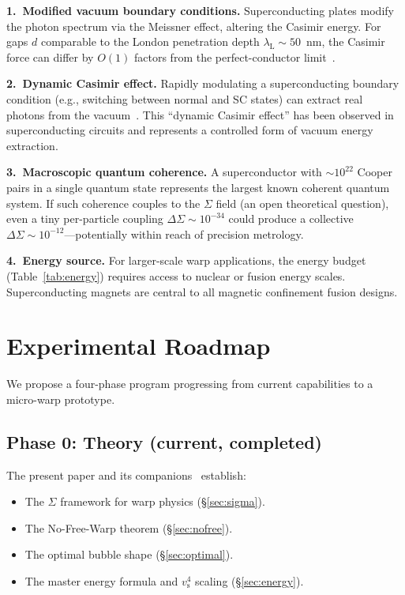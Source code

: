 \documentclass[prd,twocolumn,superscriptaddress,longbibliography]{revtex4-2}
\newcommand{\vs}{v_{\mathrm{s}}}
\begin{document}
\medskip
\noindent\textbf{1.\ Modified vacuum boundary conditions.}\;
Superconducting plates modify the photon spectrum via the Meissner
effect, altering the Casimir energy.  For gaps $d$ comparable to
the London penetration depth $\lambda_{\mathrm{L}} \sim 50$~nm,
the Casimir force can differ by $O(1)$ factors from the
perfect-conductor limit~\cite{Lambrecht2000}.

\medskip
\noindent\textbf{2.\ Dynamic Casimir effect.}\;
Rapidly modulating a superconducting boundary condition
(e.g., switching between normal and SC states) can extract real
photons from the vacuum~\cite{Wilson2011}.  This ``dynamic
Casimir effect'' has been observed in superconducting
circuits and represents a controlled form of vacuum energy
extraction.

\medskip
\noindent\textbf{3.\ Macroscopic quantum coherence.}\;
A superconductor with $\sim\!10^{22}$ Cooper pairs in a single
quantum state represents the largest known coherent quantum
system.  If such coherence couples to the $\Sigma$ field (an
open theoretical question), even a tiny per-particle coupling
$\Delta\Sigma \sim 10^{-34}$ could produce a collective
$\Delta\Sigma \sim 10^{-12}$---potentially within reach of
precision metrology.

\medskip
\noindent\textbf{4.\ Energy source.}\;
For larger-scale warp applications, the energy budget
(Table~\ref{tab:energy}) requires access to nuclear or fusion
energy scales.  Superconducting magnets are central to all
magnetic confinement fusion designs.

\section{Experimental Roadmap}
\label{sec:roadmap}

We propose a four-phase program progressing from current
capabilities to a micro-warp prototype.

\subsection{Phase 0: Theory (current, completed)}

The present paper and its companions~\cite{Huang2026a,Huang2026b}
establish:
\begin{itemize}
\item The $\Sigma$ framework for warp physics (\S\ref{sec:sigma}).
\item The No-Free-Warp theorem (\S\ref{sec:nofree}).
\item The optimal bubble shape (\S\ref{sec:optimal}).
\item The master energy formula and $\vs^4$ scaling
(\S\ref{sec:energy}).
\end{itemize}
\end{document}
